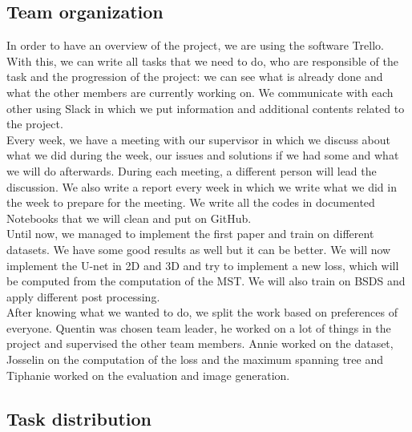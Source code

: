 \subsection{Team organization}

In order to have an overview of the project, we are using the software Trello.
With this, we can write all tasks that we need to do, who are responsible of
the task and the progression of the project: we can see what is already done
and what the other members are currently working on. We communicate with each
other using Slack in which we put information and additional contents related
to the project. \\

Every week, we have a meeting with our supervisor in which we discuss about
what we did during the week, our issues and solutions if we had some and what
we will do afterwards. During each meeting, a different person will lead the
discussion. We also write a report every week in which we write what we did in
the week to prepare for the meeting. We write all the codes in documented
Notebooks that we will clean and put on GitHub. \\

Until now, we managed to implement the first paper and train on different
datasets. We have some good results as well but it can be better. We will now
implement the U-net in 2D and 3D and try to implement a new loss, which will be
computed from the computation of the MST. We will also train on BSDS and apply
different post processing. \\


After knowing what we wanted to do, we split the work based on preferences of
everyone. Quentin was chosen team leader, he worked on a lot of things in the
project and supervised the other team members. Annie worked on the dataset,
Josselin on the computation of the loss and the maximum spanning tree and
Tiphanie worked on the evaluation and image generation. \\


\subsection{Task distribution}

